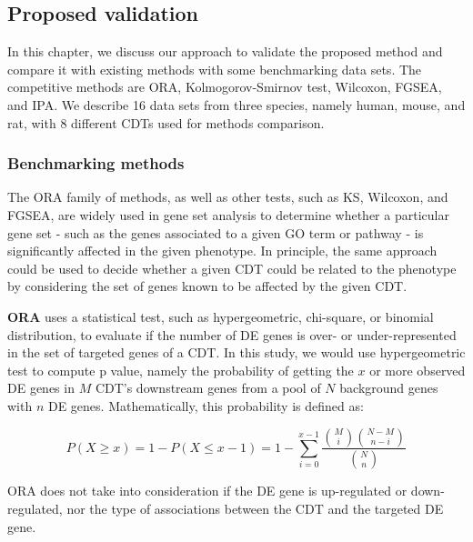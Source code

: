 

\subsection{Proposed validation}

In this chapter, we discuss our approach to validate the proposed method and compare it with existing methods with some benchmarking data sets. The competitive methods are ORA, Kolmogorov-Smirnov test, Wilcoxon, FGSEA, and IPA. We describe 16 data sets from three species, namely human, mouse, and rat, with 8 different CDTs used for methods comparison. %

\subsubsection{Benchmarking methods}

The ORA family of methods, as well as other tests, such as KS, Wilcoxon, and FGSEA, are widely used in gene set analysis to determine whether  a particular gene set - such as the genes associated to a given GO term or pathway - is significantly affected in the given phenotype. In principle, the same approach could be used to decide whether a given CDT could be related to the phenotype by considering the set of genes known to be affected by the given CDT. 

\textbf{ORA} uses a statistical test, such as hypergeometric, chi-square, or binomial distribution, to evaluate if the number of DE genes is over- or under-represented in the set of targeted genes of a CDT. In this study, we would use hypergeometric test to compute p value, namely the probability of getting the $x$ or more observed DE genes in $M$ CDT's downstream genes from a pool of $N$ background genes with $n$ DE genes. Mathematically, this probability is defined as:

\begin{equation*}
P(X \geq x) = 1-P(X \leq x -1)= 1- \sum_{i=0}^{x-1} \frac{\binom{M}{i}\binom{N-M}{n-i}}{\binom{N}{n}} 
\end{equation*}

ORA does not take into consideration if the DE gene is up-regulated or down-regulated, nor the type of associations between the CDT and the targeted DE gene.

